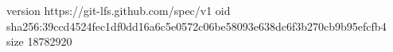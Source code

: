 version https://git-lfs.github.com/spec/v1
oid sha256:39ccd4524fec1df0dd16a6c5e0572c06be58093e638dc6f3b270cb9b95efcfb4
size 18782920
